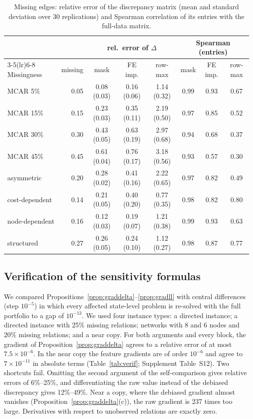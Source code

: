 \documentclass[12pt]{article}
\theoremstyle{definition}
\begin{document}
\begin{table}[hp]
\caption{Missing edges: relative error of the discrepancy matrix (mean and standard deviation over 30 replications) and Spearman correlation of its entries with the full-data matrix.}\label{tab:mis}
\centering\scriptsize
\begin{tabular}{lrcccccc}
\toprule
 & & \multicolumn{3}{c}{rel.\ error of $\Delta$} & \multicolumn{3}{c}{Spearman (entries)}\\
\cmidrule(lr){3-5}\cmidrule(lr){6-8}
Missingness & missing & mask & FE imp. & row-max & mask & FE imp. & row-max\\
\midrule
MCAR 5\% & 0.05 & 0.08 (0.03) & 0.16 (0.06) & 1.14 (0.32) & 0.99 & 0.93 & 0.67\\
MCAR 15\% & 0.15 & 0.23 (0.03) & 0.35 (0.11) & 2.19 (0.50) & 0.97 & 0.85 & 0.52\\
MCAR 30\% & 0.30 & 0.43 (0.05) & 0.63 (0.19) & 2.97 (0.68) & 0.94 & 0.68 & 0.37\\
MCAR 45\% & 0.45 & 0.61 (0.04) & 0.76 (0.17) & 3.18 (0.56) & 0.93 & 0.57 & 0.30\\
asymmetric & 0.20 & 0.28 (0.02) & 0.41 (0.16) & 2.22 (0.65) & 0.97 & 0.82 & 0.49\\
cost-dependent & 0.14 & 0.21 (0.05) & 0.40 (0.20) & 0.77 (0.35) & 0.98 & 0.82 & 0.80\\
node-dependent & 0.16 & 0.12 (0.03) & 0.19 (0.07) & 1.21 (0.38) & 0.99 & 0.93 & 0.63\\
structured & 0.27 & 0.26 (0.05) & 0.24 (0.10) & 1.12 (0.27) & 0.98 & 0.87 & 0.77\\
\bottomrule
\end{tabular}

\end{table}

\subsection{Verification of the sensitivity formulas}\label{sec:verifsens}

We compared Propositions~\ref{prop:graddelta}--\ref{prop:gradll} with central differences (step $10^{-5}$) in which every affected state-level problem is re-solved with the full portfolio to a gap of $10^{-13}$. We used four instance types: a directed instance; a directed instance with 25\% missing relations; networks with 8 and 6 nodes and 20\% missing relations; and a near copy. For both arguments and every block, the gradient of Proposition~\ref{prop:graddelta} agrees to a relative error of at most $7.5\times10^{-6}$. In the near copy the feature gradients are of order $10^{-6}$ and agree to $7\times10^{-11}$ in absolute terms (Table~\ref{tab:verif}; Supplement Table~S12). Two shortcuts fail. Omitting the second argument of the self-comparison gives relative errors of 6\%--25\%, and differentiating the raw value instead of the debiased discrepancy gives 12\%--49\%. Near a copy, where the debiased gradient almost vanishes (Proposition~\ref{prop:graddelta}(c)), the raw gradient is 237 times too large. Derivatives with respect to unobserved relations are exactly zero.
\end{document}

